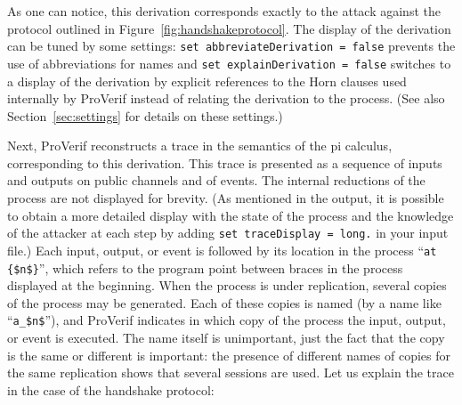 \documentclass{book}
\begin{document}
As one can notice, this derivation corresponds exactly to the attack against the protocol outlined in Figure~\ref{fig:handshakeprotocol}. The display of the derivation can be tuned by some settings: \lstinline!set abbreviateDerivation = false! prevents the use of abbreviations for names and \lstinline!set explainDerivation = false! switches to a display of the derivation by explicit references to the Horn clauses used internally by ProVerif instead of relating the derivation to the process. (See also Section~\ref{sec:settings} for details on these settings.)

Next, ProVerif reconstructs a trace in the semantics of the pi calculus, corresponding to this derivation. This trace is presented as a sequence of inputs and outputs on public channels and of events. The internal reductions of the process are not displayed for brevity. (As mentioned in the output, it is possible to obtain a more detailed display with the state of the process and the knowledge of the attacker at each step by adding \lstinline!set traceDisplay = long.! in your input file.) Each input, output, or event is followed by its location in the process ``\lstinline!at {$n$}!'', which refers to the program point between braces in the process displayed at the beginning. When the process is under replication, several copies of the process may be generated. Each of these copies is named (by a name like ``\lstinline!a_$n$!''), and ProVerif indicates in which copy of the process the input, output, or event is executed. The name itself is unimportant, just the fact that the copy is the same or different is important: the presence of different names of copies for the same replication shows that several sessions are used. Let us explain the trace in the case of the handshake protocol:
\end{document}
